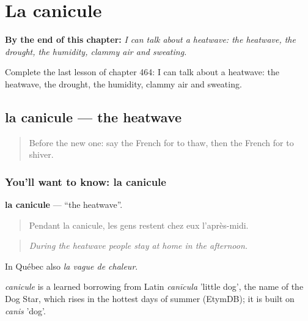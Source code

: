 
\chapter{La canicule}
\label{ch:fr-la-canicule}

\begin{chapteropening}
\textbf{By the end of this chapter:} \emph{I can talk about a heatwave: the heatwave, the drought, the humidity, clammy air and sweating.}

Complete the last lesson of chapter 464: I can talk about a heatwave: the heatwave, the drought, the humidity, clammy air and sweating.
\end{chapteropening}

\section[la canicule]{la canicule — the heatwave}

\label{lesson:FR-C464-canicule}



\begin{quote}
Before the new one: say the French for to thaw, then the French for to shiver.
\end{quote}

\subsection*{You'll want to know: la canicule}
\textbf{la canicule} — \textquotedblleft{}the heatwave\textquotedblright{}.

\begin{quote}
Pendant la canicule, les gens restent chez eux l'après-midi.
\end{quote}

\begin{quote}
\emph{During the heatwave people stay at home in the afternoon.}
\end{quote}

In Québec also \emph{la vague de chaleur}.

\begin{cousinweb}
\emph{canicule} is a learned borrowing from Latin \emph{canīcula} 'little dog', the name of the Dog Star, which rises in the hottest days of summer (EtymDB); it is built on \emph{canis} 'dog'.
\end{cousinweb}


